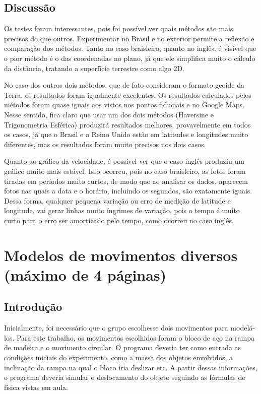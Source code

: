 \documentclass{article}
\begin{document}
\subsection{Discussão}

\qquad Os testes foram interessantes, pois foi possível ver quais métodos são mais precisos do que outros. Experimentar no Brasil e no exterior permite a reflexão e comparação dos métodos. Tanto no caso braisleiro, quanto no inglês, é visível que o pior método é o das coordenadas no plano, já que ele simplifica muito o cálculo da distância, tratando a superfície terrestre como algo 2D.

\qquad No caso dos outros dois métodos, que de fato consideram o formato geoide da Terra, os resultados foram igualmente excelentes. Os resultados calculados pelos métodos foram quase iguais aos vistos nos pontos fiduciais e no Google Maps. Nesse sentido, fica claro que usar um dos dois métodos (Haversine e Trigonometria Esférica) produzirá resultados melhores, provavelmente em todos os casos, já que o Brasil e o Reino Unido estão em latitudes e longitudes muito diferentes, mas os resultados foram muito precisos nos dois casos.

\qquad Quanto ao gráfico da velocidade, é possível ver que o caso inglês produziu um gráfico muito mais estável. Isso ocorreu, pois no caso braisleiro, as fotos foram tiradas em períodos muito curtos, de modo que ao analisar os dados, aparecem fotos nas quais a data e o horário, incluindo os segundos, são exatamente iguais. Dessa forma, qualquer pequena variação ou erro de medição de latitude e longitude, vai gerar linhas muito íngrimes de variação, pois o tempo é muito curto para o erro ser amortizado pelo tempo, como ocorreu no caso inglês.

\newpage

\section{Modelos de movimentos diversos (máximo de 4 páginas)}

\subsection{Introdução}

\qquad Inicialmente, foi necessário que o grupo escolhesse dois movimentos para modelá-los. Para este trabalho, os movimentos escolhidos foram o bloco de aço na rampa de madeira e o movimento circular. O programa deveria ter como entrada as condições iniciais do experimento, como a massa dos objetos envolvidos, a inclinação da rampa na qual o bloco iria deslizar etc. A partir dessas informações, o programa deveria simular o deslocamento do objeto seguindo as fórmulas de física vistas em aula.
\end{document}
